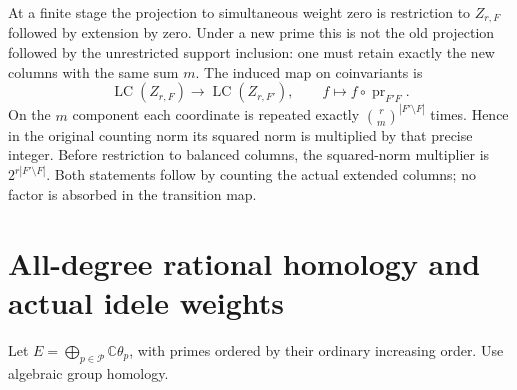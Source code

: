 \documentclass[11pt]{article}
\newcommand{\C}{\mathbb C}
\newcommand{\LC}{\operatorname{LC}}
\begin{document}
At a finite stage the projection to simultaneous weight zero is
restriction to $Z_{r,F}$ followed by extension by zero. Under a
new prime this is not the old projection followed by the unrestricted
support inclusion: one must retain exactly the new columns with the
same sum $m$. The induced map on coinvariants is
\[
 \LC(Z_{r,F})\longrightarrow\LC(Z_{r,F'}),\qquad
 f\longmapsto f\circ\operatorname{pr}_{F'F}.
 \tag{BW12}
\]
On the $m$ component each coordinate is repeated exactly
$\binom rm^{|F'\setminus F|}$ times. Hence in the original counting
norm its squared norm is multiplied by that precise integer.
Before restriction to balanced columns, the squared-norm multiplier
is $2^{r|F'\setminus F|}$. Both statements follow by counting the
actual extended columns; no factor is absorbed in the transition map.

\section{All-degree rational homology and actual idele weights}
Let $E=\bigoplus_{p\in\mathcal P}\C\theta_p$, with primes ordered
by their ordinary increasing order. Use algebraic group homology.
\end{document}
